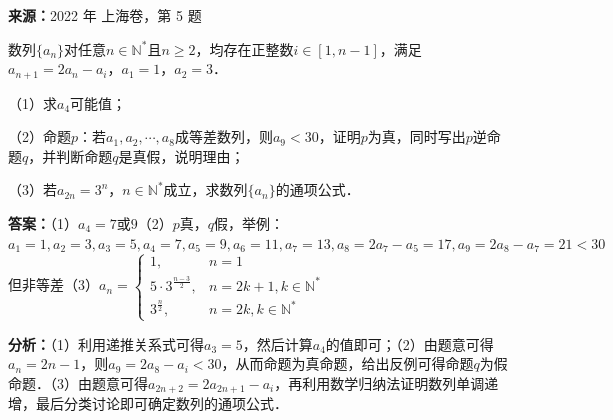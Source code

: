 \begin{question}[points=18]
\textbf{来源：}2022 年 上海卷，第 5 题\par
数列$\{a_n\}$对任意$n\in\mathbb{N}^*$且$n\geq 2$，均存在正整数$i\in[1,n-1]$，满足$a_{n+1}=2a_n-a_i$，$a_1=1$，$a_2=3$．

（1）求$a_4$可能值；

（2）命题$p$：若$a_1,a_2,\cdots,a_8$成等差数列，则$a_9<30$，证明$p$为真，同时写出$p$逆命题$q$，并判断命题$q$是真假，说明理由；

（3）若$a_{2n}=3^n$，$n\in\mathbb{N}^*$成立，求数列$\{a_n\}$的通项公式．
\begin{solution}
\textbf{答案：}（1）$a_4=7$或$9$（2）$p$真，$q$假，举例：$a_1=1,a_2=3,a_3=5,a_4=7,a_5=9,a_6=11,a_7=13,a_8=2a_7-a_5=17,a_9=2a_8-a_7=21<30$但非等差（3）$a_n=\begin{cases}1, & n=1\\5\cdot3^{\frac{n-3}{2}}, & n=2k+1,k\in\mathbb{N}^*\\3^{\frac{n}{2}}, & n=2k,k\in\mathbb{N}^*\end{cases}$

\textbf{分析：}（1）利用递推关系式可得$a_3=5$，然后计算$a_4$的值即可；（2）由题意可得$a_n=2n-1$，则$a_9=2a_8-a_i<30$，从而命题为真命题，给出反例可得命题$q$为假命题．（3）由题意可得$a_{2n+2}=2a_{2n+1}-a_i$，再利用数学归纳法证明数列单调递增，最后分类讨论即可确定数列的通项公式．


\end{solution}
\end{question}
